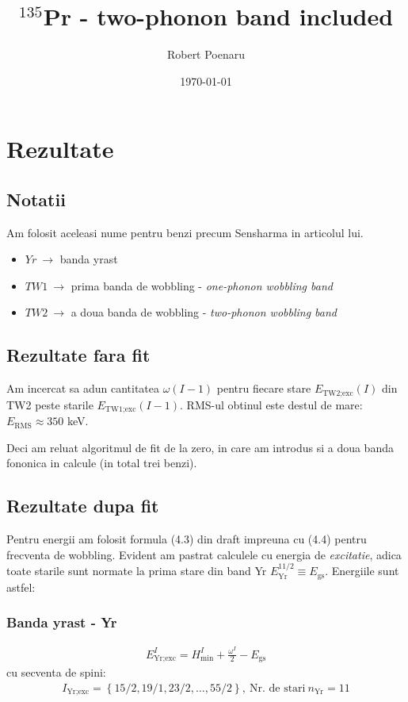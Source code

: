 \documentclass[12pt]{article}
\title{$^{135}$Pr - two-phonon band included}
\author{Robert Poenaru}
\date{\today}
\begin{document}
\maketitle

\section{Rezultate}
\subsection{Notatii}
Am folosit aceleasi nume pentru benzi precum Sensharma in articolul lui.
\begin{itemize}
    \item $Yr\ \to$ banda yrast
    \item $TW1\ \to$ prima banda de wobbling - \emph{one-phonon wobbling band}
    \item $TW2\ \to$ a doua banda de wobbling - \emph{two-phonon wobbling band} 
\end{itemize}
\subsection{Rezultate fara fit}
Am incercat sa adun cantitatea $\omega(I-1)$ pentru fiecare stare $E_\text{TW2;exc}(I)$ din TW2 peste starile $E_\text{TW1;exc}(I-1)$. RMS-ul obtinul este destul de mare: $E_\text{RMS}\approx350$ keV.
\par Deci am reluat algoritmul de fit de la zero, in care am introdus si a doua banda fononica in calcule (in total trei benzi).
\subsection{Rezultate dupa fit}
Pentru energii am folosit formula (4.3) din draft impreuna cu (4.4) pentru frecventa de wobbling. Evident am pastrat calculele cu energia de \emph{excitatie}, adica toate starile sunt normate la prima stare din band Yr $E_\text{Yr}^{11/2}\equiv E_\text{gs}$.
Energiile sunt astfel:
\subsubsection{Banda yrast - Yr}
\begin{align}
    E_\text{Yr;exc}^{I}=H_\text{min}^{I}+\frac{\omega^{I}}{2}-E_\text{gs}
\end{align}
cu secventa de spini:
\begin{align}
    I_\text{Yr;exc}=\left\{15/2,19/1,23/2,\dots,55/2\right\},\ \text{Nr. de stari}\ n_\text{Yr}=11
\end{align}
\end{document}
